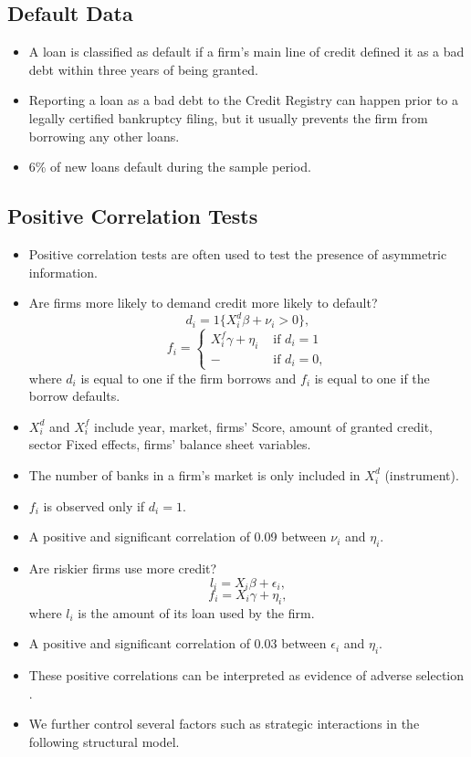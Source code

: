 \documentclass[]{book}
\providecommand{\tightlist}{%
  \setlength{\itemsep}{0pt}\setlength{\parskip}{0pt}}
\begin{document}
\subsection{Default Data}\label{default-data}

\begin{itemize}
\tightlist
\item
  A loan is classified as default if a firm's main line of credit
  defined it as a bad debt within three years of being granted.
\item
  Reporting a loan as a bad debt to the Credit Registry can happen prior
  to a legally certified bankruptcy filing, but it usually prevents the
  firm from borrowing any other loans.
\item
  6\% of new loans default during the sample period.
\end{itemize}

\subsection{Positive Correlation
Tests}\label{positive-correlation-tests}

\begin{itemize}
\tightlist
\item
  Positive correlation tests
  \citep{chiapporiTestingAsymmetricInformation2000} are often used to
  test the presence of asymmetric information.
\item
  Are firms more likely to demand credit more likely to default? \[
  d_i = 1\{X_i^d \beta + \nu_i > 0\},
  \] \[
  f_i =
  \begin{cases}
  X_i^f \gamma + \eta_i &\text{   if   } d_i = 1\\
  -&\text{    if   } d_i = 0,
  \end{cases}
  \] where \(d_i\) is equal to one if the firm borrows and \(f_i\) is
  equal to one if the borrow defaults.
\item
  \(X_i^d\) and \(X_i^f\) include year, market, firms' Score, amount of
  granted credit, sector Fixed effects, firms' balance sheet variables.
\item
  The number of banks in a firm's market is only included in \(X_i^d\)
  (instrument).
\item
  \(f_i\) is observed only if \(d_i = 1\).
\item
  A positive and significant correlation of 0.09 between \(\nu_i\) and
  \(\eta_i\).
\item
  Are riskier firms use more credit? \[
  l_i = X_i \beta + \epsilon_i,
  \] \[
  f_i = X_i \gamma + \eta_i,
  \] where \(l_i\) is the amount of its loan used by the firm.
\item
  A positive and significant correlation of 0.03 between \(\epsilon_i\)
  and \(\eta_i\).
\item
  These positive correlations can be interpreted as evidence of adverse
  selection \citep{stiglitzCreditRationingMarkets1981}.
\item
  We further control several factors such as strategic interactions in
  the following structural model.
\end{itemize}
\end{document}

